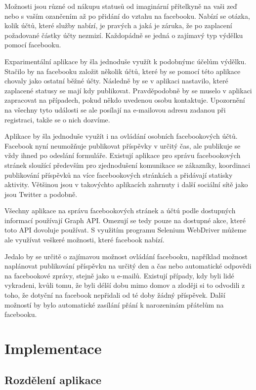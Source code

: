\documentclass[thesis=M,czech]{FITthesis}[2013/05/10]
\begin{document}
Možnosti jsou různé od nákupu statusů od imaginární přítelkyně na vaši zeď nebo s vaším ozančením až po přidání do vztahu na facebooku. Nabízí se otázka, kolik účtů, které služby nabízí, je pravých a jaká je záruka, že po zaplacení požadované částky  účty nezmizí. Každopádně se jedná o zajímavý typ výdělku pomocí facebooku.

Exparimentální aplikace by šla jednoduše využít k podobnýmc účelům výdělku. Stačilo by na facebooku založit několik účtů, které by se pomocí této aplikace chovaly jako ostatní běžné účty. Následně by se v aplikaci nastavilo, které zaplacené statusy se mají kdy publikovat. Pravděpodobně by se muselo v aplikaci zapracovat na případech, pokud někdo uvedenou osobu kontaktuje. Upozornění na všechny tyto události se ale posílají na e-mailovou adresu zadanou při registraci, takže se o nich dozvíme.

Aplikace by šla jednoduše využít i na ovládání osobních facebookových účtů. Facebook nyní neumožňuje publikovat příspěvky v určitý čas, ale publikuje se vždy ihned po odeslání formuláře. Existují aplikace pro správu facebookových stránek sloužící především pro zjednodušení komunikace se zákazníky, koordinaci publikování příspěvků na více facebookových stránkách a přidávají statisky aktivity. Většinou jsou v takovýchto aplikacích zahrnuty i další sociální sítě jako jsou Twitter a podobně.

Všechny aplikace na správu facebookových stránek a účtú podle dostupných informací používají Graph API. Omezují se tedy pouze na dostupné akce, které toto API dovoluje používat. S využitím programu Selenium WebDriver můžeme ale využívat veškeré možnosti, které facebook nabízí.

Jedalo by se určitě o zajímavou možnost ovládání facebooku, například možnost naplánovat publikování příspěvku na určitý den a čas nebo automatické odpovědi na facebookové zprávy, stejně jako u e-mailů. Existují případy, kdy byli lidé vykradeni, kvůli tomu, že byli délší dobu mimo domov a zloději si to odvodili z toho, že dotyční na facebook nepřidali od té doby žádný příspěvek. Další možností by bylo automatické zasílání přání k narozeninám přátelům na facebooku.



\chapter{Implementace}

\section{Rozdělení aplikace}
\end{document}
